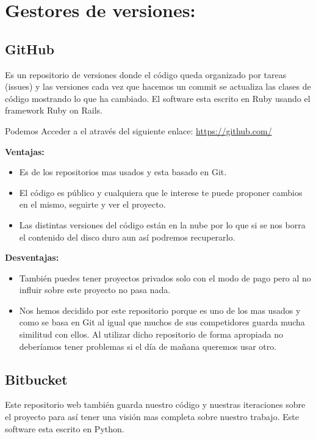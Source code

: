 \section{Gestores de versiones:}
\subsection{GitHub}
Es un repositorio de versiones donde el código queda organizado por tareas (issues) y las versiones cada vez que hacemos un commit se actualiza las clases de código mostrando lo que ha cambiado.
El software esta escrito en Ruby usando el framework Ruby on Rails.

Podemos Acceder a el através del siguiente enlace: 
\url{https://github.com/}



\textbf{Ventajas:}

\begin{itemize}
\item Es de los repositorios mas usados y esta basado en Git.

\item El código es público y cualquiera que le interese te puede proponer cambios en el mismo, seguirte y ver el proyecto.

\item Las distintas versiones del código están en la nube por lo que si se nos borra el contenido del disco duro aun así podremos recuperarlo.
\end{itemize}

\textbf{Desventajas:}

\begin{itemize}
\item También puedes tener proyectos privados solo con el modo de pago pero al no influir sobre este proyecto no pasa nada.

\item Nos hemos decidido por este repositorio porque es uno de los mas usados y como se basa en Git al igual que muchos de sus competidores guarda mucha similitud con ellos.
Al utilizar dicho repositorio de forma apropiada no deberíamos tener problemas si el día de mañana queremos usar otro.
\end{itemize}

\subsection{Bitbucket}
Este repositorio web también guarda nuestro código y nuestras iteraciones sobre el proyecto para así tener una visión mas completa sobre nuestro trabajo.
Este software esta escrito en Python.

